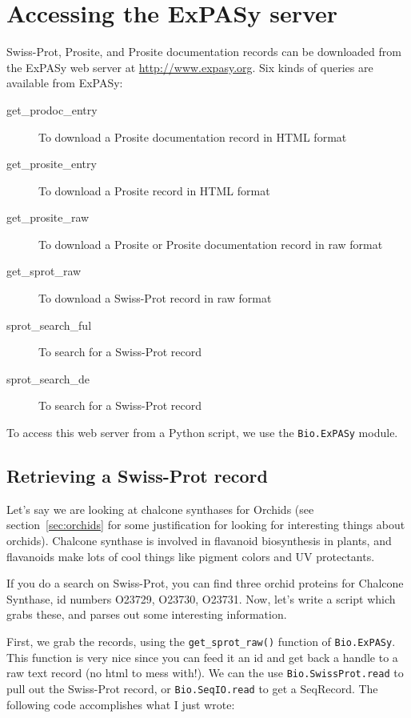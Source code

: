 \documentclass{report}
\begin{document}
\section{Accessing the ExPASy server}

Swiss-Prot, Prosite, and Prosite documentation records can be downloaded from the ExPASy web server at \url{http://www.expasy.org}. Six kinds of queries are available from ExPASy:
\begin{description}
\item[get\_prodoc\_entry]To download a Prosite documentation record in HTML format
\item[get\_prosite\_entry]To download a Prosite record in HTML format
\item[get\_prosite\_raw]To download a Prosite or Prosite documentation record in raw format
\item[get\_sprot\_raw]To download a Swiss-Prot record in raw format
\item[sprot\_search\_ful]To search for a Swiss-Prot record
\item[sprot\_search\_de]To search for a Swiss-Prot record
\end{description}
To access this web server from a Python script, we use the \verb|Bio.ExPASy| module.

\subsection{Retrieving a Swiss-Prot record}
\label{subsec:expasy_swissprot}

Let's say we are looking at chalcone synthases for Orchids (see section~\ref{sec:orchids} for some justification for looking for interesting things about orchids). Chalcone synthase is involved in flavanoid biosynthesis in plants, and flavanoids make lots of cool things like pigment colors and UV protectants. 

If you do a search on Swiss-Prot, you can find three orchid proteins for Chalcone Synthase, id numbers O23729, O23730, O23731. Now, let's write a script which grabs these, and parses out some interesting information.

First, we grab the records, using the \verb|get_sprot_raw()| function of \verb|Bio.ExPASy|. This function is very nice since you can feed it an id and get back a handle to a raw text record (no html to mess with!). We can the use \verb|Bio.SwissProt.read| to pull out the Swiss-Prot record, or \verb|Bio.SeqIO.read| to get a SeqRecord. The following code accomplishes what I just wrote:
\end{document}
